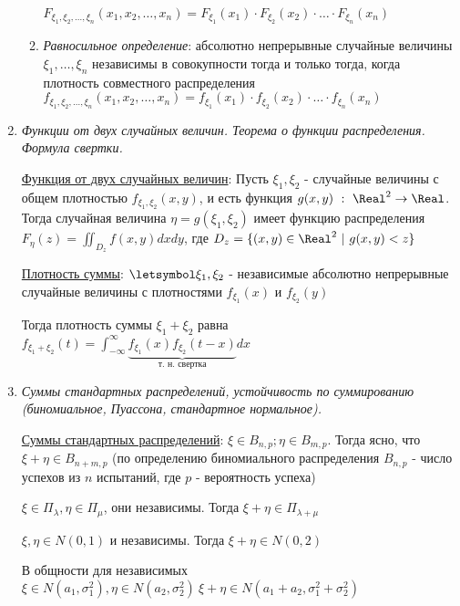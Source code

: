 \begin{enumerate}
\begin{enumerate}
        $F_{\xi_1, \xi_2, \dots, \xi_n}(x_1, x_2, \dots, x_n) = F_{\xi_1}(x_1) \cdot F_{\xi_2}(x_2) \cdot \dots \cdot F_{\xi_n}(x_n)$

        \item \textit{Равносильное определение}: абсолютно непрерывные случайные величины $\xi_1, \dots, \xi_n$ независимы в совокупности тогда и только тогда, 
        когда плотность совместного распределения $f_{\xi_1, \xi_2, \dots, \xi_n}(x_1, x_2, \dots, x_n) = f_{\xi_1}(x_1) \cdot f_{\xi_2}(x_2) \cdot \dots \cdot f_{\xi_n}(x_n)$
    \end{enumerate}

    \item \textit{Функции от двух случайных величин. Теорема о функции распределения. Формула свертки.}
    
    \hyperlink{functionoftworandomvariables}{Функция от двух случайных величин}: \Ths Пусть $\xi_1, \xi_2$ - случайные величины с общем плотностью $f_{\xi_1, \xi_2}(x, y)$, и есть функция
    $g(x, y) \ : \ \Real^2 \rightarrow \Real$. Тогда случайная величина $\eta = g(\xi_1, \xi_2)$ имеет
    функцию распределения $F_{\eta}(z) = \iint_{D_z} f(x, y)dxdy$, 
    где $D_z = \{(x, y) \in \Real^2 \ | \ g(x, y) < z\}$

    \hyperlink{convolutionformula}{Плотность суммы}: \Ths $\letsymbol \xi_1, \xi_2$ - независимые абсолютно непрерывные случайные величины с плотностями
    $f_{\xi_1}(x)$ и $f_{\xi_2}(y)$

    Тогда плотность суммы $\xi_1 + \xi_2$ равна $f_{\xi_1 + \xi_2}(t) = \int_{-\infty}^\infty 
    \underset{\text{т. н. свертка}}{\underbrace{f_{\xi_1}(x) f_{\xi_2}(t - x)}} dx$

    \item \textit{Суммы стандартных распределений, устойчивость по суммированию (биномиальное, Пуассона, стандартное нормальное).}

    \hyperlink{sumofstandarddistributions}{Суммы стандартных распределений}: 
     $\xi \in B_{n, p}; \eta \in B_{m, p}$. Тогда ясно, что $\xi + \eta \in B_{n + m, p}$ 
    (по определению биномиального распределения $B_{n, p}$ - число успехов из $n$ испытаний, где $p$ - вероятность успеха)

     $\xi \in \Pi_{\lambda}, \eta \in \Pi_{\mu}$, они независимы. Тогда $\xi + \eta \in \Pi_{\lambda + \mu}$

     $\xi, \eta \in N(0, 1)$ и независимы. Тогда $\xi + \eta \in N(0, 2)$

     В общности для независимых $\xi \in N(a_1, \sigma^2_1), \eta \in N(a_2, \sigma_2^2) \ \xi + \eta \in N(a_1 + a_2, \sigma_1^2 + \sigma_2^2)$ 


\end{enumerate}
